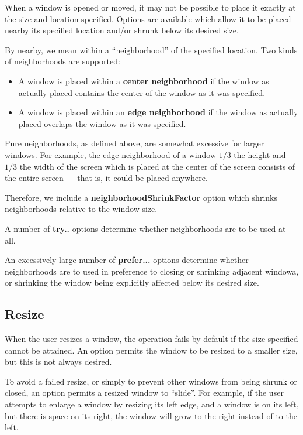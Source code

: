 When a window is opened or moved, it may not be possible to place
it exactly at the size and location specified.
Options are available which allow it to be placed nearby its specified
location and/or shrunk below its desired size.

By nearby, we mean within a ``neighborhood'' of the specified location.
Two kinds of neighborhoods are supported:

\begin{itemize}
\item A window is placed within a {\bf center neighborhood}
if the window as actually placed contains the center of the window as it
was specified.

\item A window is placed within an {\bf edge neighborhood} if the window as
actually placed overlaps the window as it was specified.
\end{itemize}

Pure neighborhoods, as defined above, are somewhat excessive for larger
windows. For example, the edge neighborhood of a window $1/3$ the height
and $1/3$ the width of the screen which is placed at the center of the
screen consists of the entire screen --- that is, it could be placed
anywhere.

Therefore, we include a {\bf neighborhoodShrinkFactor} option which
shrinks neighborhoods relative to the window size.

A number of {\bf try..} options determine whether neighborhoods are to be
used at all.

An excessively large number of {\bf prefer...} options determine
whether neighborhoods are to used in preference to closing or shrinking
adjacent windowa, or shrinking the window being explicitly affected
below its desired size.

\subsection{Resize}

When the user resizes a window, the operation fails by default if the
size specified cannot be attained.  An option permits the window to be
resized to a smaller size, but this is not always desired.

To avoid a failed resize, or simply to prevent other windows from being
shrunk or closed, an option permits a resized window to ``slide''.
For example, if the user attempts to enlarge a window by resizing its
left edge, and a window is on its left, but there is space on its right,
the window will grow to the right instead of to the left.

